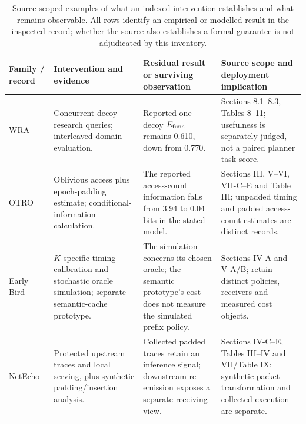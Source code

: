 \begin{table}[t]\centering\footnotesize
\caption{Source-scoped examples of what an indexed intervention establishes and what remains observable. All rows identify an empirical or modelled result in the inspected record; whether the source also establishes a formal guarantee is not adjudicated by this inventory.}\label{tab:r35-guarantee-examples}
\begin{tabularx}{\textwidth}{@{}p{}p{}YY@{}}\toprule
Family / record & Intervention and evidence & Residual result or surviving observation & Source scope and deployment implication\\\midrule
WRA~\cite{jeong2026wra} & Concurrent decoy research queries; interleaved-domain evaluation. & Reported one-decoy $E_{\rm func}$ remains 0.610, down from 0.770. & Sections 8.1--8.3, Tables 8--11; usefulness is separately judged, not a paired planner task score.\\
OTRO~\cite{lee2026otro} & Oblivious access plus epoch-padding estimate; conditional-information calculation. & The reported access-count information falls from 3.94 to 0.04 bits in the stated model. & Sections III, V--VI, VII-C--E and Table III; unpadded timing and padded access-count estimates are distinct records.\\
Early Bird~\cite{earlybird2025} & $K$-specific timing calibration and stochastic oracle simulation; separate semantic-cache prototype. & The simulation concerns its chosen oracle; the semantic prototype's cost does not measure the simulated prefix policy. & Sections IV-A and V-A/B; retain distinct policies, receivers and measured cost objects.\\
NetEcho~\cite{netecho2025} & Protected upstream traces and local serving, plus synthetic padding/insertion analysis. & Collected padded traces retain an inference signal; downstream re-emission exposes a separate receiving view. & Sections IV-C--E, Tables III--IV and VII/Table IX; synthetic packet transformation and collected execution are separate.\\\bottomrule
\end{tabularx}\end{table}
